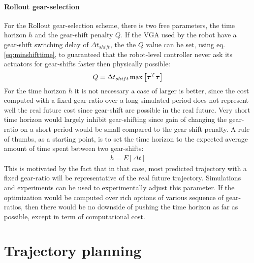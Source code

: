 \paragraph{Rollout gear-selection}
%
For the Rollout gear-selection scheme, there is two free parameters, the time horizon $h$ and the gear-shift penalty $Q$. If the VGA used by the robot have a gear-shift switching delay of $\Delta t_{shift}$, the the $Q$ value can be set, using eq. \eqref{eq:minshifttime}, to guaranteed that the robot-level controller never ask its actuators for gear-shifts faster then physically possible:
%
\begin{align}
Q = \Delta t_{shift} \operatornamewithlimits{max} \left[ \vec{\tau}^T \vec{\tau} \right]
\end{align}
%
For the time horizon $h$ it is not necessary a case of larger is better, since the cost computed with a fixed gear-ratio over a long simulated period does not represent well the real future cost since gear-shift are possible in the real future. Very short time horizon would largely inhibit gear-shifting since gain of changing the gear-ratio on a short period would be small compared to the gear-shift penalty. A rule of thumbs, as a starting point, is to set the time horizon to the expected average amount of time spent between two gear-shifts:
%
\begin{align}
h = E \left[ \Delta t \right]
\end{align}
%
This is motivated by the fact that in that case, most predicted trajectory with a fixed gear-ratio will be representative of the real future trajectory. Simulations and experiments can be used to experimentally adjust this parameter. If the optimization would be computed over rich options of various sequence of gear-ratios, then there would be no downside of pushing the time horizon as far as possible, except in term of computational cost.



\newpage
\section{Trajectory planning}
\label{sec:SamplingBasedTrajectoryPlanner}

